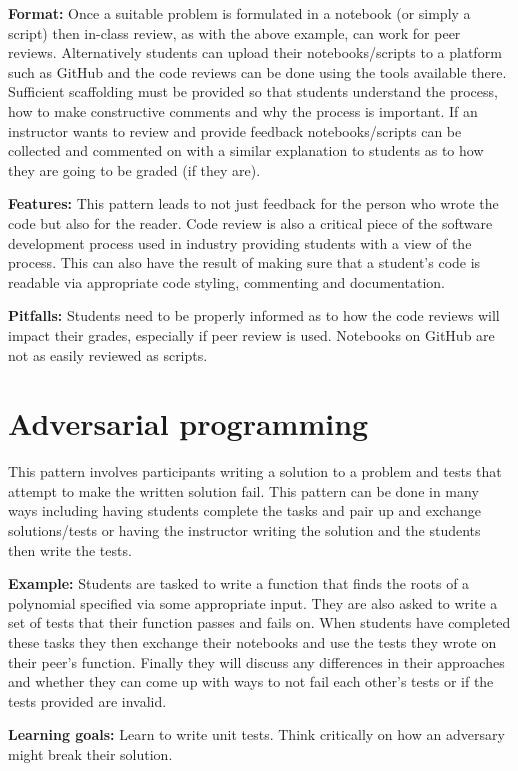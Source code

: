 \documentclass[]{book}
\begin{document}
\textbf{Format:} Once a suitable problem is formulated in a notebook (or
simply a script) then in-class review, as with the above example, can
work for peer reviews. Alternatively students can upload their
notebooks/scripts to a platform such as GitHub and the code reviews can
be done using the tools available there. Sufficient scaffolding must be
provided so that students understand the process, how to make
constructive comments and why the process is important. If an instructor
wants to review and provide feedback notebooks/scripts can be collected
and commented on with a similar explanation to students as to how they
are going to be graded (if they are).

\textbf{Features:} This pattern leads to not just feedback for the
person who wrote the code but also for the reader. Code review is also a
critical piece of the software development process used in industry
providing students with a view of the process. This can also have the
result of making sure that a student's code is readable via appropriate
code styling, commenting and documentation.

\textbf{Pitfalls:} Students need to be properly informed as to how the
code reviews will impact their grades, especially if peer review is
used. Notebooks on GitHub are not as easily reviewed as scripts.

\section{Adversarial programming}\label{adversarial-programming}

This pattern involves participants writing a solution to a problem and
tests that attempt to make the written solution fail. This pattern can
be done in many ways including having students complete the tasks and
pair up and exchange solutions/tests or having the instructor writing
the solution and the students then write the tests.

\textbf{Example:} Students are tasked to write a function that finds the
roots of a polynomial specified via some appropriate input. They are
also asked to write a set of tests that their function passes and fails
on. When students have completed these tasks they then exchange their
notebooks and use the tests they wrote on their peer's function. Finally
they will discuss any differences in their approaches and whether they
can come up with ways to not fail each other's tests or if the tests
provided are invalid.

\textbf{Learning goals:} Learn to write unit tests. Think critically on
how an adversary might break their solution.
\end{document}
